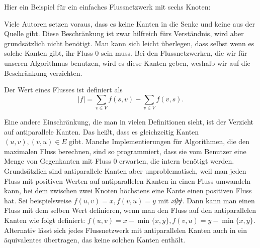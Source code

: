 Hier ein Beispiel für ein einfaches Flussnetzwerk mit sechs Knoten:
\begin{center}
\end{center}

Viele Autoren setzen voraus, dass es keine Kanten in die Senke und keine aus der Quelle gibt. Diese Beschränkung ist zwar hilfreich fürs Verständnis, wird aber grundsätzlich nicht benötigt. Man kann sich leicht überlegen, dass selbst wenn es solche Kanten gibt, ihr Fluss 0 sein muss. Bei den Flussnetzwerken, die wir für unseren Algorithmus benutzen, wird es diese Kanten geben, weshalb wir auf die Beschränkung verzichten. 

\begin{definition}
	Der Wert eines Flusses ist definiert als
	\begin{equation}
		|f| = \sum_{v \in V}{f(s,v)} - \sum_{v \in V}{f(v,s)}.
	\end{equation} 
\end{definition}

Eine andere Einschränkung, die man in vielen Definitionen sieht, ist der Verzicht auf antiparallele Kanten. Das heißt, dass es gleichzeitig Kanten $(u,v), (v,u) \in E$ gibt. Manche Implementierungen für Algorithmen, die den maximalen Fluss berechnen, sind so programmiert, dass sie vom Benutzer eine Menge von Gegenkanten mit Fluss 0 erwarten, die intern benötigt werden. Grundsätzlich sind antiparallele Kanten aber unproblematisch, weil man jeden Fluss mit positiven Werten auf antiparallelen Kanten in einen Fluss umwandeln kann, bei dem zwischen zwei Knoten höchstens eine Kante einen positiven Fluss hat. Sei beispielsweise $f(u,v) = x, f(v,u) = y$ mit $x \not 0 \not y$. Dann kann man einen Fluss mit dem selben Wert definieren, wenn man den Fluss auf den antiparallelen Kanten wie folgt definiert: $f(u,v) = x - \min\{x,y\}, f(v,u) = y - \min\{x,y\}$. Alternativ lässt sich jedes Flussnetzwerk mit antiparallelen Kanten auch in ein äquivalentes übertragen, das keine solchen Kanten enthält.

